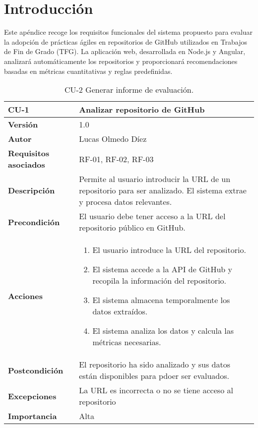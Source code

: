 
\section{Introducción}

Este apéndice recoge los requisitos funcionales del sistema propuesto para evaluar la adopción de prácticas ágiles en repositorios de GitHub utilizados en Trabajos de Fin de Grado (TFG). La aplicación web, desarrollada en Node.js y Angular, analizará automáticamente los repositorios y proporcionará recomendaciones basadas en métricas cuantitativas y reglas predefinidas.

\begin{table}[p]
	\centering
	\begin{tabularx}{\linewidth}{ p{} p{} }
		\toprule
		\textbf{CU-1}    & Analizar repositorio de GitHub \\
		\toprule
		\textbf{Versión}              & 1.0 \\
		\textbf{Autor}                & Lucas Olmedo Díez \\
		\textbf{Requisitos asociados} & RF-01, RF-02, RF-03 \\
		\textbf{Descripción}          & Permite al usuario introducir la URL de un repositorio para ser analizado. El sistema extrae y procesa datos relevantes. \\
		\textbf{Precondición}         & El usuario debe tener acceso a la URL del repositorio público en GitHub. \\
		\textbf{Acciones}             &
		\begin{enumerate}
			\item El usuario introduce la URL del repositorio.
			\item El sistema accede a la API de GitHub y recopila la información del repositorio.
			\item El sistema almacena temporalmente los datos extraídos.
			\item El sistema analiza los datos y calcula las métricas necesarias.
		\end{enumerate}\\
		\textbf{Postcondición}        & El repositorio ha sido analizado y sus datos están disponibles para pdoer ser evaluados. \\
		\textbf{Excepciones}          & La URL es incorrecta o no se tiene acceso al repositorio \\
		\textbf{Importancia}          & Alta \\
		\bottomrule
	\end{tabularx}
	\caption{CU-2 Generar informe de evaluación.}
\end{table}

